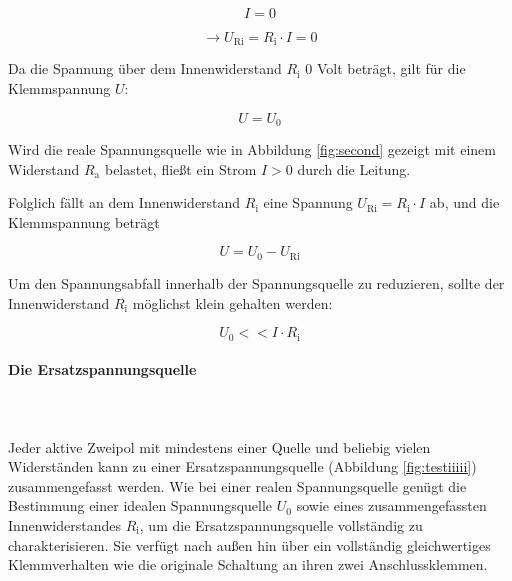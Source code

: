 \begin{frame}
{		\begin{equation*}
			I = 0 
		\end{equation*}
		
		\begin{equation*}
			\rightarrow U_\mathrm{Ri} = R_\mathrm{i} \cdot I = 0
		\end{equation*}
		
		Da die Spannung über dem Innenwiderstand $R_\mathrm{i}$ 0 Volt beträgt, gilt für die Klemmspannung $U$:
		
		\begin{equation*}
			U = U_0
		\end{equation*}
		
		Wird die reale Spannungsquelle wie in Abbildung \ref{fig:second} gezeigt mit einem Widerstand $R_\mathrm{a}$ belastet,
		fließt ein Strom $I > 0$ durch die Leitung.
		
		Folglich fällt an dem Innenwiderstand $R_\mathrm{i}$ eine Spannung $U_\mathrm{Ri} = R_\mathrm{i} \cdot I$ ab, und die Klemmspannung
		beträgt
		
		\begin{equation*}
			U = U_0 - U_\mathrm{Ri}
		\end{equation*}
		
		Um den Spannungsabfall innerhalb der Spannungsquelle zu reduzieren, sollte der 
		Innenwiderstand $R_\mathrm{i}$ möglichst klein gehalten werden:
		
		\begin{equation*}
			U_0 << I \cdot R_\mathrm{i}
		\end{equation*}
		
		
		
		\paragraph{Die Ersatzspannungsquelle}\\
		
		\phantom{text}\\
		
		
		
		Jeder aktive Zweipol mit mindestens einer Quelle und beliebig vielen Widerständen kann zu einer
		Ersatzspannungsquelle (Abbildung \ref{fig:testiiiii}) zusammengefasst werden. Wie bei einer realen Spannungsquelle genügt die Bestimmung einer
		idealen Spannungsquelle $U_0$ sowie eines zusammengefassten Innenwiderstandes $R_\mathrm{i}$, um die 
		Ersatzspannungsquelle vollständig zu charakterisieren.
		Sie verfügt nach außen hin über ein vollständig gleichwertiges Klemmverhalten wie die originale Schaltung an
		ihren zwei Anschlussklemmen.
		
}
\end{frame}

